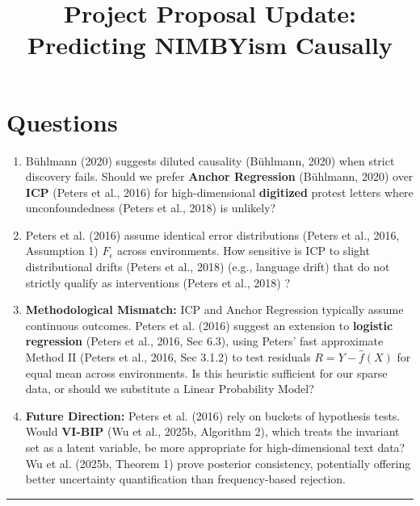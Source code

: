 \documentclass[11pt]{article}
\begin{document}
\section*{Questions}
\begin{enumerate}
    \item Bühlmann (2020) suggests diluted causality (Bühlmann, 2020) %
    when strict discovery fails. Should we prefer \textbf{Anchor Regression} (Bühlmann, 2020) %
    over \textbf{ICP} (Peters et al., 2016) %
    for high-dimensional \textbf{digitized} protest letters where unconfoundedness (Peters et al., 2018) %
    is unlikely?
    \item Peters et al. (2016) assume identical error distributions (Peters et al., 2016, Assumption 1) %
    $F_\epsilon$ across environments. How sensitive is ICP to slight distributional drifts (Peters et al., 2018) %
    (e.g., language drift) that do not strictly qualify as interventions (Peters et al., 2018) %
    ?
    \item \textbf{Methodological Mismatch:} ICP and Anchor Regression typically assume continuous outcomes. Peters et al. (2016) suggest an extension to \textbf{logistic regression} (Peters et al., 2016, Sec 6.3), %
    using Peters' fast approximate Method II (Peters et al., 2016, Sec 3.1.2) to test residuals $R = Y - \hat{f}(X)$ for equal mean across environments. Is this heuristic sufficient for our sparse data, or should we substitute a Linear Probability Model?
    \item \textbf{Future Direction:} Peters et al. (2016) rely on buckets of hypothesis tests. Would \textbf{VI-BIP} (Wu et al., 2025b, Algorithm 2), which treats the invariant set as a latent variable, be more appropriate for high-dimensional text data? Wu et al. (2025b, Theorem 1) prove posterior consistency, potentially offering better uncertainty quantification than frequency-based rejection.
\end{enumerate}

\newpage
\title{\vspace{-2em}\textbf{Project Proposal Update: Predicting NIMBYism Causally}}
\vspace{1em}
\hrule
\vspace{1em}
\end{document}
